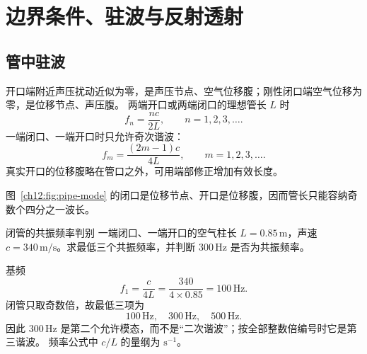 \section{边界条件、驻波与反射透射}
\subsection{管中驻波}

开口端附近声压扰动近似为零，是声压节点、空气位移腹；刚性闭口端空气位移为零，是位移节点、声压腹。
两端开口或两端闭口的理想管长 $L$ 时
\begin{equation}
 f_n=\frac{nc}{2L},\qquad n=1,2,3,\ldots.
\end{equation}
一端闭口、一端开口时只允许奇次谐波：
\begin{equation}
 f_m=\frac{(2m-1)c}{4L},\qquad m=1,2,3,\ldots.
\end{equation}
真实开口的位移腹略在管口之外，可用端部修正增加有效长度。

\begin{center}\begin{minipage}{\linewidth}\centering
{}
\label{ch12:fig:pipe-mode}
\end{minipage}\end{center}
图~\ref{ch12:fig:pipe-mode} 的闭口是位移节点、开口是位移腹，因而管长只能容纳奇数个四分之一波长。

\begin{origexamplebox}{闭管的共振频率判别}
\label{ch12:ex:07}
一端闭口、一端开口的空气柱长 $L=0.85\,\mathrm m$，声速 $c=340\,\mathrm{m/s}$。求最低三个共振频率，并判断 $300\,\mathrm{Hz}$ 是否为共振频率。

\ThQClosedPipe
\end{origexamplebox}
\begin{xesolution}
\ThAClosedPipe

基频
\[
 f_1=\frac c{4L}=\frac{340}{4\times0.85}=100\,\mathrm{Hz}.
\]
闭管只取奇数倍，故最低三项为
\[
 \boxed{100\,\mathrm{Hz},\quad300\,\mathrm{Hz},\quad500\,\mathrm{Hz}}.
\]
因此 $300\,\mathrm{Hz}$ 是第二个允许模态，而不是“二次谐波”；按全部整数倍编号时它是第三谐波。
频率公式中 $c/L$ 的量纲为 $\mathrm{s^{-1}}$。
\end{xesolution}

